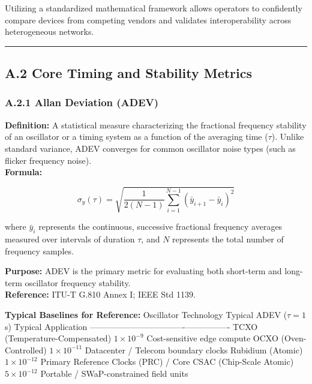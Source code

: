 Utilizing a standardized mathematical framework allows operators to
confidently compare devices from competing vendors and validates
interoperability across heterogeneous networks.

\begin{center}\rule{0.5\linewidth}{0.5pt}\end{center}

\subsection{A.2 Core Timing and Stability
Metrics}\label{a.2-core-timing-and-stability-metrics}

\subsubsection{A.2.1 Allan Deviation
(ADEV)}\label{a.2.1-allan-deviation-adev}

\textbf{Definition:} A statistical measure characterizing the fractional
frequency stability of an oscillator or a timing system as a function of
the averaging time (\(\tau\)). Unlike standard variance, ADEV converges
for common oscillator noise types (such as flicker frequency noise).\\
\textbf{Formula:}

\[ \sigma_y(\tau) = \sqrt{ \frac{1}{2(N-1)} \sum_{i=1}^{N-1} (\bar{y}_{i+1} - \bar{y}_i)^2 } \]

where \(\bar{y}_i\) represents the continuous, successive fractional
frequency averages measured over intervals of duration \(\tau\), and
\(N\) represents the total number of frequency samples.

\textbf{Purpose:} ADEV is the primary metric for evaluating both
short-term and long-term oscillator frequency stability.\\
\textbf{Reference:} ITU-T G.810 Annex I; IEEE Std 1139.

\textbf{Typical Baselines for Reference:} \textbar{} Oscillator
Technology \textbar{} Typical ADEV (\(\tau = 1\) s) \textbar{} Typical
Application \textbar{}
\textbar------------------\textbar----------------\textbar----------------\textbar{}
\textbar{} TCXO (Temperature-Compensated) \textbar{}
\(1 \times 10^{-9}\) \textbar{} Cost-sensitive edge compute \textbar{}
\textbar{} OCXO (Oven-Controlled) \textbar{} \(1 \times 10^{-11}\)
\textbar{} Datacenter / Telecom boundary clocks \textbar{} \textbar{}
Rubidium (Atomic) \textbar{} \(1 \times 10^{-12}\) \textbar{} Primary
Reference Clocks (PRC) / Core \textbar{} \textbar{} CSAC (Chip-Scale
Atomic) \textbar{} \(5 \times 10^{-12}\) \textbar{} Portable /
SWaP-constrained field units \textbar{}


